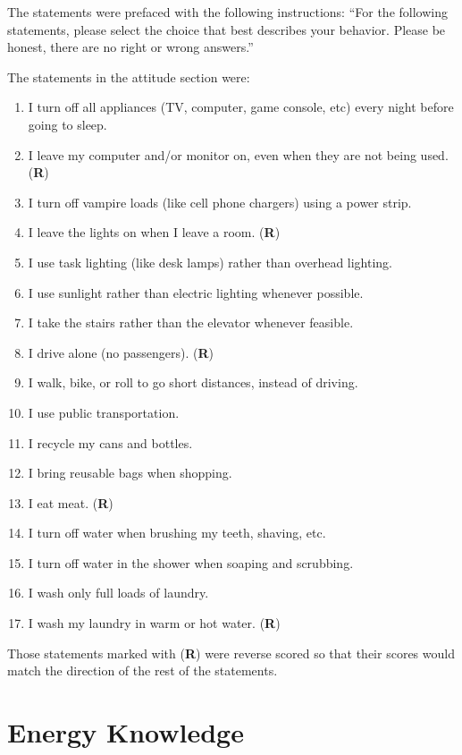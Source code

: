 The statements were prefaced with the following instructions: ``For the following statements, please select the choice that best describes your behavior. Please be honest, there are no right or wrong answers.''

The statements in the attitude section were:

\begin{enumerate}
	\item I turn off all appliances (TV, computer, game console, etc) every night before going to sleep.
	\item I leave my computer and/or monitor on, even when they are not being used. (\textbf{R})
	\item I turn off vampire loads (like cell phone chargers) using a power strip.
	\item I leave the lights on when I leave a room. (\textbf{R})
	\item I use task lighting (like desk lamps) rather than overhead lighting.
	\item I use sunlight rather than electric lighting whenever possible.
	\item I take the stairs rather than the elevator whenever feasible.
	\item I drive alone (no passengers). (\textbf{R})
	\item I walk, bike, or roll to go short distances, instead of driving.
	\item I use public transportation.
	\item I recycle my cans and bottles.
	\item I bring reusable bags when shopping.
	\item I eat meat. (\textbf{R})
	\item I turn off water when brushing my teeth, shaving, etc.
	\item I turn off water in the shower when soaping and scrubbing.
	\item I wash only full loads of laundry.
	\item I wash my laundry in warm or hot water. (\textbf{R})
\end{enumerate}

Those statements marked with (\textbf{R}) were reverse scored so that their scores would match the direction of the rest of the statements.


\section{Energy Knowledge}
\label{sec:knowledge-items}

